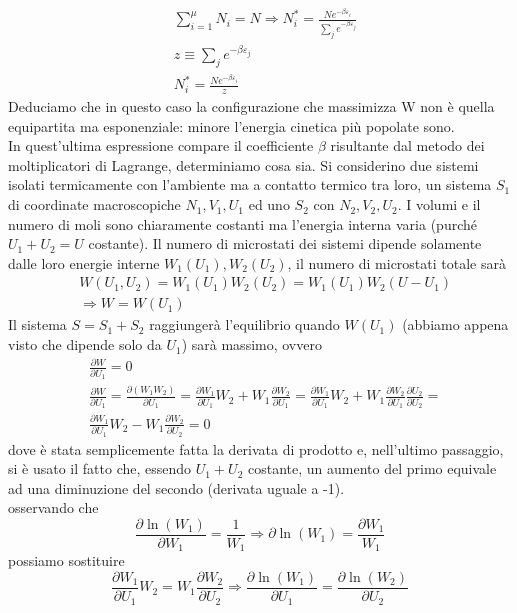 \documentclass[
10pt, %
a4paper, %
oneside, %
headinclude,footinclude, %
BCOR5mm, %
]{scrartcl}
\begin{document}
\begin{align*}
	&\sum_{i=1}^\mu N_i = N \Rightarrow N_i^* = \frac{Ne^{-\beta\varepsilon_i}}{\sum_je^{-\beta\varepsilon_j}}\\
	&z\equiv \sum_je^{-\beta\varepsilon_j}\\
	&N_i^* = \frac{Ne^{-\beta\varepsilon_i}}{z}
\end{align*} 
Deduciamo che in questo caso la configurazione che massimizza W non è quella equipartita ma esponenziale: minore l'energia cinetica più popolate sono. \\
In quest'ultima espressione compare il coefficiente $\beta$ risultante dal metodo dei moltiplicatori di Lagrange, determiniamo cosa sia. Si considerino due sistemi isolati termicamente con l'ambiente ma a contatto termico tra loro, un sistema \(S_1\) di coordinate macroscopiche \(N_1, V_1, U_1\) ed uno \(S_2\) con \(N_2,V_2,U_2\). I volumi e il numero di moli sono chiaramente costanti ma l'energia interna varia (purché \(U_1+U_2 = U\) costante). Il numero di microstati dei sistemi dipende solamente dalle loro energie interne \(W_1(U_1), W_2(U_2)\), il numero di microstati totale sarà 
\begin{align*}
	&W(U_1,U_2) = W_1(U_1)W_2(U_2)=W_1(U_1)W_2(U-U_1)\\
	&\Rightarrow W = W(U_1)
\end{align*} 
Il sistema \(S=S_1+S_2\) raggiungerà l'equilibrio quando \(W(U_1)\) (abbiamo appena visto che dipende solo da \(U_1\)) sarà massimo, ovvero
\begin{align*}
	&\frac{\partial W}{\partial U_1}=0\\
	&\frac{\partial W}{\partial U_1}=\frac{\partial (W_1W_2)}{\partial U_1}=\frac{\partial W_1}{\partial U_1}W_2+W_1\frac{\partial W_2}{\partial U_1}=\frac{\partial W_1}{\partial U_1}W_2+W_1\frac{\partial W_2}{\partial U_1}\frac{\partial U_2}{\partial U_2}=\\
	&\frac{\partial W_1}{\partial U_1}W_2-W_1\frac{\partial W_2}{\partial U_2}=0
\end{align*} 
dove è stata semplicemente fatta la derivata di prodotto e, nell'ultimo passaggio, si è usato il fatto che, essendo \(U_1+U_2 \) costante, un aumento del primo equivale ad una diminuzione del secondo (derivata uguale a -1).\\
osservando che 
\[\frac{\partial \ln(W_1)}{\partial W_1}=\frac{1}{W_1}\Rightarrow \partial \ln(W_1)=\frac{\partial W_1}{W_1}\]
possiamo sostituire 
\[\frac{\partial W_1}{\partial U_1}W_2 = W_1\frac{\partial W_2}{\partial U_2} \Rightarrow \frac{\partial \ln(W_1)}{\partial U_1} = \frac{\partial \ln(W_2)}{\partial U_2}\]
\end{document}

